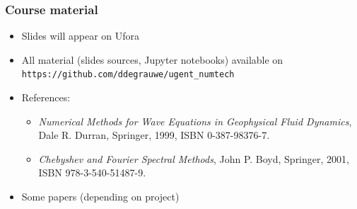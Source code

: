 \documentclass[aspectratio=149,9pt]{beamer}
\begin{document}
\begin{frame}
	\frametitle{Course material}
	\vspace*{-5mm}
	\begin{itemize}
		\item Slides will appear on Ufora\vspace*{3ex}
		\item All material (slides sources, Jupyter notebooks) available on \texttt{https://github.com/ddegrauwe/ugent\_numtech}\vspace*{3ex}
		\item References:\vspace*{2ex}
			\begin{itemize}
				\item \emph{Numerical Methods for Wave Equations in Geophysical Fluid Dynamics},\\ Dale R. Durran, Springer, 1999, ISBN 0-387-98376-7.\vspace*{2ex}
				\item \emph{Chebyshev and Fourier Spectral Methods}, John P. Boyd, Springer, 2001, ISBN 978-3-540-51487-9.\vspace*{3ex}
			\end{itemize}
		\item Some papers (depending on project)
	\end{itemize}
\end{frame}
%
%
\end{document}
